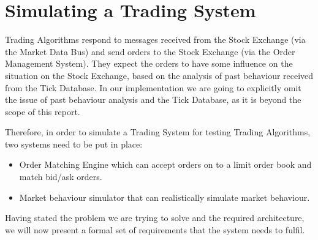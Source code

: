 \section{Simulating a Trading System}

Trading Algorithms respond to messages received from the Stock Exchange (via the Market Data Bus) and send orders to the Stock Exchange (via the Order Management System). They expect the orders to have some influence on the situation on the Stock Exchange, based on the analysis of past behaviour received from the Tick Database. In our implementation we are going to explicitly omit the issue of past behaviour analysis and the Tick Database, as it is beyond the scope of this report. 

Therefore, in order to simulate a Trading System for testing Trading Algorithms, two systems need to be put in place:
\begin{itemize}
\item Order Matching Engine which can accept orders on to a limit order book and match bid/ask orders.
\item Market behaviour simulator that can realistically simulate market behaviour. 
\end{itemize}

Having stated the problem we are trying to solve and the required architecture, we will now present a formal set of requirements that the system needs to fulfil.
